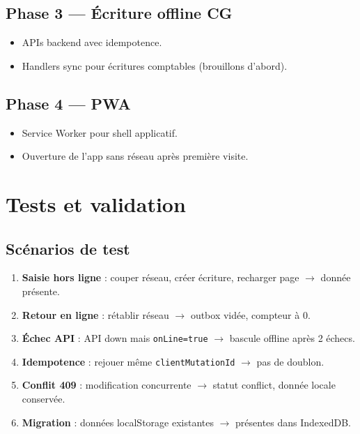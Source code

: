 \documentclass[12pt,a4paper]{report}
\begin{document}
\section{Phase 3 — Écriture offline CG}

\begin{itemize}
  \item APIs backend avec idempotence.
  \item Handlers sync pour écritures comptables (brouillons d'abord).
\end{itemize}

\section{Phase 4 — PWA}

\begin{itemize}
  \item Service Worker pour shell applicatif.
  \item Ouverture de l'app sans réseau après première visite.
\end{itemize}

\chapter{Tests et validation}

\section{Scénarios de test}

\begin{enumerate}
  \item \textbf{Saisie hors ligne} : couper réseau, créer écriture, recharger page $\rightarrow$ donnée présente.
  \item \textbf{Retour en ligne} : rétablir réseau $\rightarrow$ outbox vidée, compteur à 0.
  \item \textbf{Échec API} : API down mais \texttt{onLine=true} $\rightarrow$ bascule offline après 2 échecs.
  \item \textbf{Idempotence} : rejouer même \texttt{clientMutationId} $\rightarrow$ pas de doublon.
  \item \textbf{Conflit 409} : modification concurrente $\rightarrow$ statut conflict, donnée locale conservée.
  \item \textbf{Migration} : données localStorage existantes $\rightarrow$ présentes dans IndexedDB.
\end{enumerate}
\end{document}
